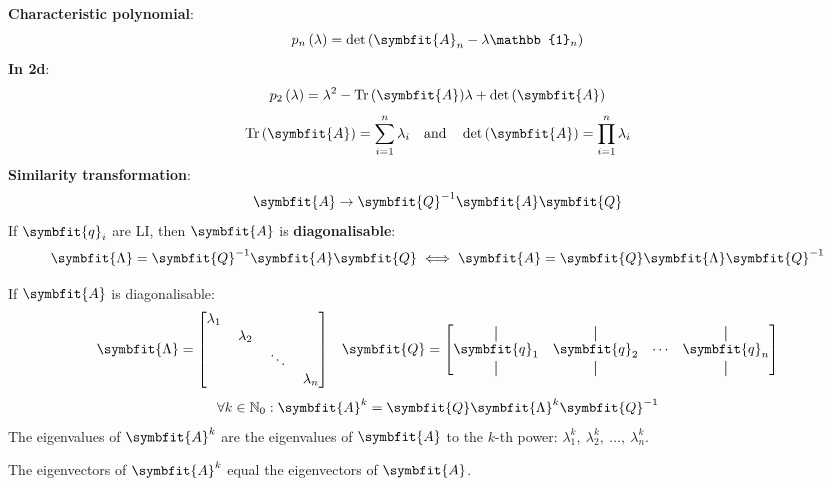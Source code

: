 \documentclass{article}
\begin{document}
\begin{minipage}[t]{126.1962963mm}
\begin{multicols*}{2}
        \textbf{Characteristic polynomial}:
        \begin{equation*}
            p_n\left(\lambda\right) = \det{\left( \symbfit{A}_n - \lambda\mathbb{1}_n \right)}
        \end{equation*}
        \textbf{In 2d}:
        \begin{equation*}
            p_2\left(\lambda\right) = \lambda^2-\tr{\left( \symbfit{A} \right)}\lambda + \det{\left( \symbfit{A} \right)}
        \end{equation*}
        \begin{equation*}
            \tr{\left( \symbfit{A} \right)} = \sum_{i=1}^n \lambda_i \quad \text{and} \quad
            \det{\left( \symbfit{A} \right)} = \prod_{i=1}^n \lambda_i
        \end{equation*}
        \textbf{Similarity transformation}:
        \begin{equation*}
            \symbfit{A}\rightarrow \symbfit{Q}^{-1}\symbfit{A}\symbfit{Q}
        \end{equation*}
        If $\symbfit{q}_i$ are LI, then $\symbfit{A}$ is
        \textbf{diagonalisable}:
        \begin{equation*}
            \symbfit{\Lambda}=\symbfit{Q}^{-1}\symbfit{A}\symbfit{Q} \iff \symbfit{A}=\symbfit{Q}\symbfit{\Lambda}\symbfit{Q}^{-1}
        \end{equation*}
    \end{multicols*}
    If $\symbfit{A}$ is diagonalisable:
    \begin{equation*}
        \symbfit{\Lambda}=\mqty[\dmat{\lambda_1,\: \lambda_2,\: \ddots,\: \lambda_n}] \quad
        \symbfit{Q}=\mqty[\vertbar & \vertbar & & \vertbar \\ \symbfit{q}_1 &
            \symbfit{q}_2 & \cdots & \symbfit{q}_n \\ \vertbar & \vertbar & & \vertbar]
    \end{equation*}
    \begin{equation*}
        \forall k \in \mathbb{N}_0:\symbfit{A}^k = \symbfit{Q} \symbfit{\Lambda}^k \symbfit{Q}^{-1}
    \end{equation*}
    The eigenvalues of $\symbfit{A}^k$ are the eigenvalues of $\symbfit{A}$
    to the $k$-th power: $\lambda_1^k,\: \lambda_2^k,\: \dots,\: \lambda_n^k$.

    The eigenvectors of $\symbfit{A}^k$ equal the eigenvectors of $\symbfit{A}$.
\end{minipage}
\end{document}
